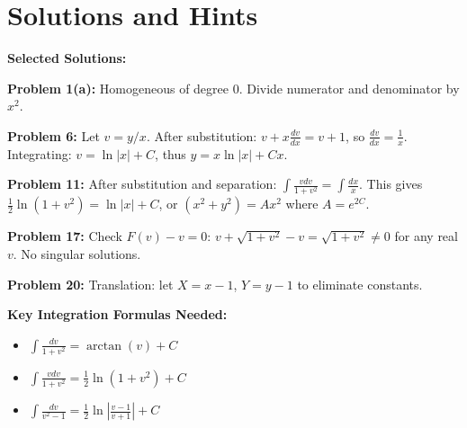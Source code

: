 \documentclass[12pt]{article}
\begin{document}
\section*{Solutions and Hints}

\textbf{Selected Solutions:}

\textbf{Problem 1(a):} Homogeneous of degree 0. Divide numerator and denominator by $x^2$.

\textbf{Problem 6:} Let $v = y/x$. After substitution: $v + x\frac{dv}{dx} = v + 1$, so $\frac{dv}{dx} = \frac{1}{x}$.
Integrating: $v = \ln|x| + C$, thus $y = x\ln|x| + Cx$.

\textbf{Problem 11:} After substitution and separation: $\int \frac{v dv}{1 + v^2} = \int \frac{dx}{x}$.
This gives $\frac{1}{2}\ln(1 + v^2) = \ln|x| + C$, or $(x^2 + y^2) = Ax^2$ where $A = e^{2C}$.

\textbf{Problem 17:} Check $F(v) - v = 0$: $v + \sqrt{1 + v^2} - v = \sqrt{1 + v^2} \neq 0$ for any real $v$. No singular solutions.

\textbf{Problem 20:} Translation: let $X = x - 1$, $Y = y - 1$ to eliminate constants.

\textbf{Key Integration Formulas Needed:}
\begin{itemize}
    \item $\int \frac{dv}{1 + v^2} = \arctan(v) + C$
    \item $\int \frac{v dv}{1 + v^2} = \frac{1}{2}\ln(1 + v^2) + C$
    \item $\int \frac{dv}{v^2 - 1} = \frac{1}{2}\ln\left|\frac{v-1}{v+1}\right| + C$
\end{itemize}
\end{document}
